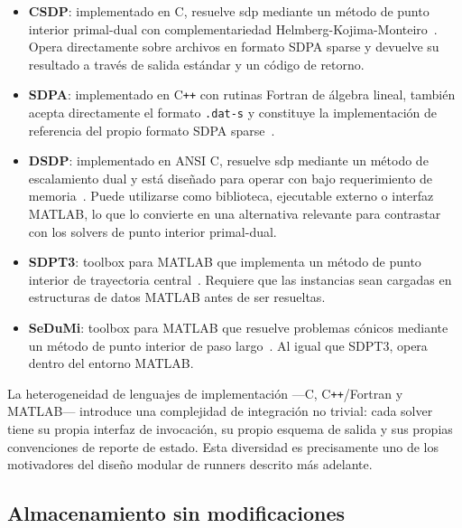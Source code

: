 \begin{itemize}
    \item \textbf{CSDP}: implementado en C, resuelve \acrshort{sdp} mediante un método
    de punto interior primal-dual con complementariedad
    Helmberg-Kojima-Monteiro~\cite{borchersCSDPLibrarySemidefinite1999}.
    Opera directamente sobre archivos en formato SDPA sparse y devuelve su resultado
    a través de salida estándar y un código de retorno.

    \item \textbf{SDPA}: implementado en C\texttt{++} con rutinas Fortran de álgebra
    lineal, también acepta directamente el formato \texttt{.dat-s} y constituye la
    implementación de referencia del propio formato SDPA
    sparse~\cite{SDPAOfficialPage}.

    \item \textbf{DSDP}: implementado en ANSI C, resuelve \acrshort{sdp} mediante un
    método de escalamiento dual y está diseñado para operar con bajo requerimiento de
    memoria~\cite{bensonAlgorithm875DSDP5software2008}.
    Puede utilizarse como biblioteca, ejecutable externo o interfaz MATLAB, lo que lo
    convierte en una alternativa relevante para contrastar con los solvers de punto
    interior primal-dual.

    \item \textbf{SDPT3}: toolbox para MATLAB que implementa un método de punto interior
    de trayectoria central~\cite{tohImplementationUsageSDPT32012a}.
    Requiere que las instancias sean cargadas en estructuras de datos MATLAB antes de
    ser resueltas.

    \item \textbf{SeDuMi}: toolbox para MATLAB que resuelve problemas cónicos mediante
    un método de punto interior de paso largo~\cite{sturmUSINGSEDUMI1022001}.
    Al igual que SDPT3, opera dentro del entorno MATLAB.
\end{itemize}

La heterogeneidad de lenguajes de implementación —C, C\texttt{++}/Fortran y MATLAB—
introduce una complejidad de integración no trivial: cada solver tiene su propia
interfaz de invocación, su propio esquema de salida y sus propias convenciones de
reporte de estado.
Esta diversidad es precisamente uno de los motivadores del diseño modular de runners
descrito más adelante.

\subsection{Almacenamiento sin modificaciones}
\label{subsec:avance_solvers_almacenamiento}


